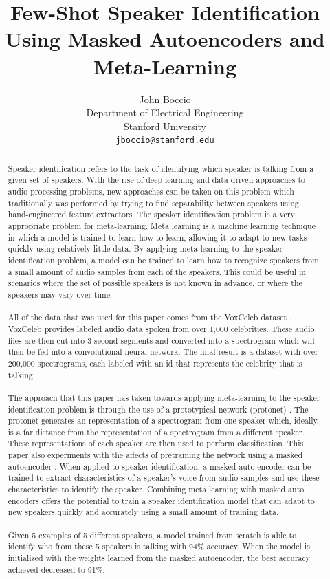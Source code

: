 \documentclass{article}
\title{Few-Shot Speaker Identification Using Masked Autoencoders and Meta-Learning}
\author{
  John Boccio \\
  Department of Electrical Engineering\\
  Stanford University\\
  \texttt{jboccio@stanford.edu} \\
}
\begin{document}
\maketitle

\begin{abstract}
Speaker identification refers to the task of identifying which speaker is talking from a given set of 
speakers. With the rise of deep learning and data driven approaches to audio processing problems, new approaches can be
taken on this problem which traditionally was performed by trying to find separability between
speakers using hand-engineered feature extractors. The speaker identification problem is a very appropriate problem for meta-learning. 
Meta learning is a machine learning technique in which a model is trained to learn how to learn, allowing it to 
adapt to new tasks quickly using relatively little data. By applying meta-learning to the speaker identification problem, 
a model can be trained to learn how to recognize speakers from a small amount of audio samples from each of the speakers. 
This could be useful in scenarios where the set of possible speakers is not known in advance, or where the speakers may vary over time.
\\
\\
All of the data that was used for this paper comes from the VoxCeleb dataset \cite{DBLP:journals/corr/NagraniCZ17}. VoxCeleb
provides labeled audio data spoken from over 1,000 celebrities. These audio files are then cut into 3 second segments and 
converted into a spectrogram which will then be fed into a convolutional neural network. The final
result is a dataset with over 200,000 spectrograms, each labeled with an id that represents the celebrity that is talking.
\\
\\
The approach that this paper has taken towards applying meta-learning to the speaker identification problem is through the 
use of a prototypical network (protonet) \cite{DBLP:journals/corr/SnellSZ17}. The protonet generates an representation of a
spectrogram from one speaker which, ideally, is a far distance from the representation of a spectrogram from a different
speaker. These representations of each speaker are then used to perform classification. This paper also experiments with 
the affects of pretraining the network using a masked autoencoder \cite{DBLP:journals/corr/abs-2111-06377}. When applied to speaker identification, 
a masked auto encoder can be trained to extract characteristics of a speaker's voice from audio samples and use these 
characteristics to identify the speaker. Combining meta learning with masked auto encoders offers the potential to train 
a speaker identification model that can adapt to new speakers quickly and accurately using a small amount of training data. 
\\
\\
Given 5 examples of 5 different speakers, a model trained from scratch is able to identify who from these 5 speakers is
talking with 94\% accuracy. When the model is initialized with the weights learned from the masked autoencoder, the best
accuracy achieved decreased to 91\%.

\end{abstract}
\end{document}
